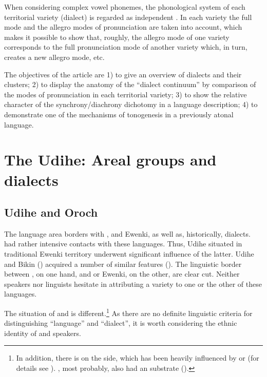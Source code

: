 \documentclass[output=paper,colorlinks,citecolor=brown]{langscibook}
\begin{document}
When considering complex vowel phonemes, the phonological system of each territorial variety (dialect) is regarded as independent \citep{Trudgill1985}. In each variety the full mode and the allegro modes of pronunciation are taken into account, which makes it possible to show that, roughly, the allegro mode of one variety corresponds to the full pronunciation mode of another variety which, in turn, creates a new allegro mode, etc.

The objectives of the article are 1) to give an overview of  dialects and their clusters; 2) to display the anatomy of the “dialect continuum” by comparison of the modes of pronunciation in each territorial variety; 3) to show the relative character of the synchrony/diachrony dichotomy in a language description; 4) to demonstrate one of the mechanisms of tonogenesis in a previously atonal language. 


\section{The Udihe: Areal groups and dialects}

\subsection{Udihe and Oroch}

The  language area borders with ,  and Ewenki, as well as, historically,  dialects.  had rather intensive contacts with these languages. Thus,  Udihe situated in traditional Ewenki territory underwent significant influence of the latter.  Udihe and Bikin  () acquired a number of similar features (\citealt{Perekhvalskaya2001}). The linguistic border between , on one hand, and  or Ewenki, on the other, are clear cut. Neither speakers nor linguists hesitate in attributing a variety to one or the other of these languages.

The situation of  and  is different.\footnote{In addition, there is  on the  side, which has been heavily influenced by  or  (for details see \citealt{Hölzl2018b}). , most probably, also had an  substrate (\citealt{Pevnov2012}).} As there are no definite linguistic criteria for distinguishing “language” and “dialect”, it is worth considering the ethnic identity of  and  speakers. 
\end{document}
